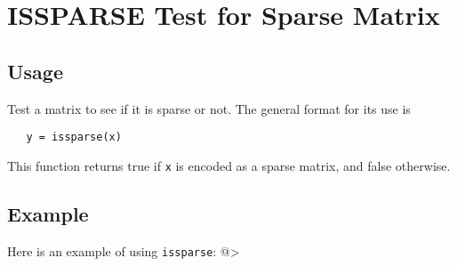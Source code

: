 \section{ISSPARSE Test for Sparse Matrix}

\subsection{Usage}

Test a matrix to see if it is sparse or not.  The general
format for its use is 
\begin{verbatim}
   y = issparse(x)
\end{verbatim}
This function returns true if \verb|x| is encoded as a sparse
matrix, and false otherwise.
\subsection{Example}

Here is an example of using \verb|issparse|:
@>
